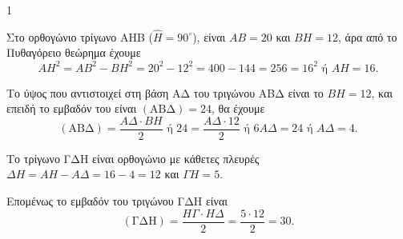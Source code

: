 \begin{ylh}{1}
    \item [ΛΥΣΗ]
\end{ylh}
\begin{alist}
    \item Στο ορθογώνιο τρίγωνο ΑΗΒ ($\hat{H} = 90^\circ$), είναι $AB = 20$ και $BH = 12$, άρα από το Πυθαγόρειο θεώρημα έχουμε
    \[ AH^2 = AB^2 - BH^2 = 20^2 - 12^2 = 400 - 144 = 256 = 16^2 \text{ ή } AH = 16. \]

    \item Το ύψος που αντιστοιχεί στη βάση ΑΔ του τριγώνου ΑΒΔ είναι το $BH = 12$, και επειδή το εμβαδόν του είναι $(\text{ΑΒΔ}) = 24$, θα έχουμε
    \[ (\text{ΑΒΔ}) = \frac{ΑΔ \cdot ΒΗ}{2} \text{ ή } 24 = \frac{ΑΔ \cdot 12}{2} \text{ ή } 6ΑΔ = 24 \text{ ή } ΑΔ = 4. \]

    \item Το τρίγωνο ΓΔΗ είναι ορθογώνιο με κάθετες πλευρές $ΔΗ = ΑΗ - ΑΔ = 16 - 4 = 12$ και $ΓΗ = 5$.

    Επομένως το εμβαδόν του τριγώνου ΓΔΗ είναι 
    \[ (\text{ΓΔΗ}) = \frac{ΗΓ \cdot ΗΔ}{2} = \frac{5 \cdot 12}{2} = 30. \]
\end{alist}